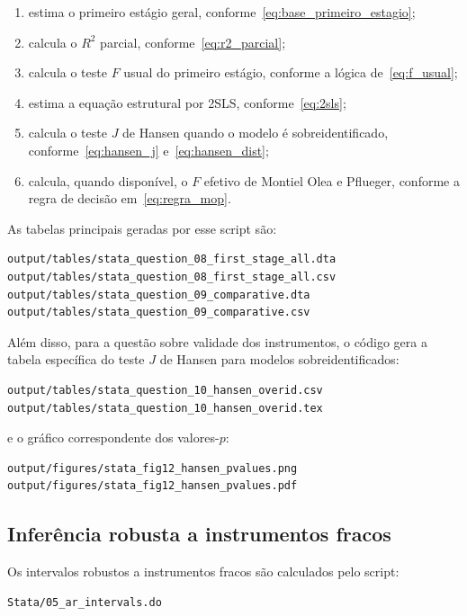 \documentclass[12pt,a4paper]{article}
\begin{document}
\begin{enumerate}[label=(\roman*)]
    \item estima o primeiro estágio geral, conforme~\eqref{eq:base_primeiro_estagio};
    \item calcula o \(R^2\) parcial, conforme~\eqref{eq:r2_parcial};
    \item calcula o teste \(F\) usual do primeiro estágio, conforme a lógica de~\eqref{eq:f_usual};
    \item estima a equação estrutural por 2SLS, conforme~\eqref{eq:2sls};
    \item calcula o teste $J$ de Hansen quando o modelo é sobreidentificado, conforme~\eqref{eq:hansen_j} e~\eqref{eq:hansen_dist};
    \item calcula, quando disponível, o $F$ efetivo de Montiel Olea e Pflueger, conforme a regra de decisão em~\eqref{eq:regra_mop}.
\end{enumerate}

As tabelas principais geradas por esse script são:

\begin{verbatim}
output/tables/stata_question_08_first_stage_all.dta
output/tables/stata_question_08_first_stage_all.csv
output/tables/stata_question_09_comparative.dta
output/tables/stata_question_09_comparative.csv
\end{verbatim}

Além disso, para a questão sobre validade dos instrumentos, o código gera a tabela específica do teste \(J\) de Hansen para modelos sobreidentificados:

\begin{verbatim}
output/tables/stata_question_10_hansen_overid.csv
output/tables/stata_question_10_hansen_overid.tex
\end{verbatim}

e o gráfico correspondente dos valores-$p$:

\begin{verbatim}
output/figures/stata_fig12_hansen_pvalues.png
output/figures/stata_fig12_hansen_pvalues.pdf
\end{verbatim}

\subsection*{Inferência robusta a instrumentos fracos}

Os intervalos robustos a instrumentos fracos são calculados pelo script:

\begin{verbatim}
Stata/05_ar_intervals.do
\end{verbatim}
\end{document}
